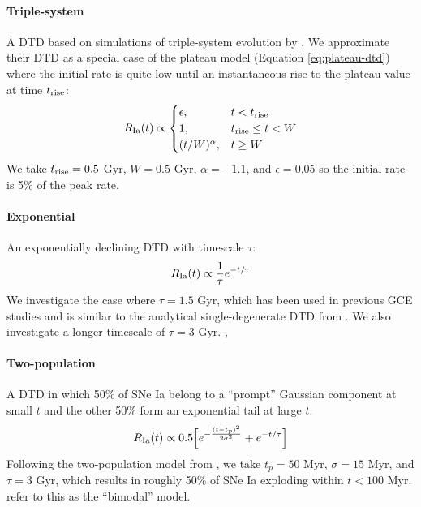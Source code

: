 \documentclass[twocolumn,twocolappendix,linenumbers]{aastex631}
\begin{document}
\paragraph{Triple-system} A DTD based on simulations of triple-system evolution by \citet{Rajamuthukumar2022-TripleEvolution}. We approximate their DTD as a special case of the plateau model (Equation \ref{eq:plateau-dtd}) where the initial rate is quite low until an instantaneous rise to the plateau value at time $t_{\rm rise}$:
\begin{equation}
    R_{\rm Ia}(t) \propto
    \begin{cases}
        \epsilon, & t < t_{\rm rise} \\
        1, & t_{\rm rise} \leq t < W \\
        (t / W) ^ \alpha, & t \geq W
    \end{cases}
    \label{eq:triple-dtd}
\end{equation}
We take $t_{\rm rise}=0.5$ Gyr, $W=0.5$ Gyr, $\alpha=-1.1$, and $\epsilon=0.05$ so the initial rate is 5\% of the peak rate.

\paragraph{Exponential} An exponentially declining DTD with timescale $\tau$:
\begin{equation}
    R_{\rm Ia}(t) \propto \frac{1}{\tau} e^{-t/\tau}
    \label{eq:exponential-dtd}
\end{equation}
We investigate the case where $\tau=1.5$ Gyr, which has been used in previous GCE studies \citep[e.g.,][]{Schonrich2009-RadialMixing,Weinberg2017-ChemicalEquilibrium} and is similar to the analytical single-degenerate DTD from \citet{Greggio2005-AnalyticalRates}. We also investigate a longer timescale of $\tau=3$ Gyr. \citet{Matteucci1986-SupernovaEnrichment}, \citet{Stolger2020-ExponentialDTD}

\paragraph{Two-population} A DTD in which 50\% of SNe Ia belong to a ``prompt'' Gaussian component at small $t$ and the other 50\% form an exponential tail at large $t$:
\begin{equation}
    R_{\rm Ia}(t) \propto 0.5\Big[e^{-\frac{(t-t_p)^2}{2\sigma^2}} + e^{-t/\tau}\Big]
    \label{eq:prompt-dtd}
\end{equation}
Following the two-population model from \citet{Mannucci2006-TwoPopulations}, we take $t_p=50$ Myr, $\sigma=15$ Myr, and $\tau=3$ Gyr, which results in roughly 50\% of SNe Ia exploding within $t<100$ Myr. \citet{Poulhazan2018-PrecisionPollution} refer to this as the ``bimodal'' model.
\end{document}
